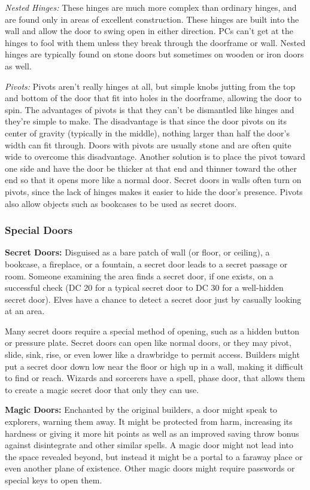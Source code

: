 \textit{Nested Hinges:} These hinges are much more complex than ordinary hinges, and are found only in areas of excellent construction. These hinges are built into the wall and allow the door to swing open in either direction. PCs can't get at the hinges to fool with them unless they break through the doorframe or wall. Nested hinges are typically found on stone doors but sometimes on wooden or iron doors as well.

\textit{Pivots:} Pivots aren't really hinges at all, but simple knobs jutting from the top and bottom of the door that fit into holes in the doorframe, allowing the door to spin. The advantages of pivots is that they can't be dismantled like hinges and they're simple to make. The disadvantage is that since the door pivots on its center of gravity (typically in the middle), nothing larger than half the door's width can fit through. Doors with pivots are usually stone and are often quite wide to overcome this disadvantage. Another solution is to place the pivot toward one side and have the door be thicker at that end and thinner toward the other end so that it opens more like a normal door. Secret doors in walls often turn on pivots, since the lack of hinges makes it easier to hide the door's presence. Pivots also allow objects such as bookcases to be used as secret doors.

\subsubsection{Special Doors}
\textbf{Secret Doors:} Disguised as a bare patch of wall (or floor, or ceiling), a bookcase, a fireplace, or a fountain, a secret door leads to a secret passage or room. Someone examining the area finds a secret door, if one exists, on a successful  check (DC 20 for a typical secret door to DC 30 for a well-hidden secret door). Elves have a chance to detect a secret door just by casually looking at an area.

Many secret doors require a special method of opening, such as a hidden button or pressure plate. Secret doors can open like normal doors, or they may pivot, slide, sink, rise, or even lower like a drawbridge to permit access. Builders might put a secret door down low near the floor or high up in a wall, making it difficult to find or reach. Wizards and sorcerers have a spell, phase door, that allows them to create a magic secret door that only they can use.

\textbf{Magic Doors:} Enchanted by the original builders, a door might speak to explorers, warning them away. It might be protected from harm, increasing its hardness or giving it more hit points as well as an improved saving throw bonus against disintegrate and other similar spells. A magic door might not lead into the space revealed beyond, but instead it might be a portal to a faraway place or even another plane of existence. Other magic doors might require passwords or special keys to open them.

